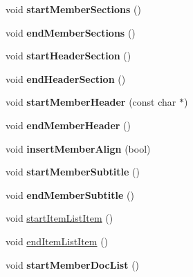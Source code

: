 \begin{DoxyCompactItemize}
\item 
\hypertarget{class_man_generator_aa363f7f143f8451b0fd035e9856f1b87}{void {\bfseries start\-Member\-Sections} ()}\label{class_man_generator_aa363f7f143f8451b0fd035e9856f1b87}

\item 
\hypertarget{class_man_generator_a2f9645e00372366ad64476dbc66cd5ac}{void {\bfseries end\-Member\-Sections} ()}\label{class_man_generator_a2f9645e00372366ad64476dbc66cd5ac}

\item 
\hypertarget{class_man_generator_add9e7a492a43830dd3c77cd0e5c06884}{void {\bfseries start\-Header\-Section} ()}\label{class_man_generator_add9e7a492a43830dd3c77cd0e5c06884}

\item 
\hypertarget{class_man_generator_aeca202ed7306f7d9aa20f8e707d96301}{void {\bfseries end\-Header\-Section} ()}\label{class_man_generator_aeca202ed7306f7d9aa20f8e707d96301}

\item 
\hypertarget{class_man_generator_ae6947537ee279d8d1fe810bc69b3fc7f}{void {\bfseries start\-Member\-Header} (const char $\ast$)}\label{class_man_generator_ae6947537ee279d8d1fe810bc69b3fc7f}

\item 
\hypertarget{class_man_generator_a618c1bfc8806d29116abac6b5817c137}{void {\bfseries end\-Member\-Header} ()}\label{class_man_generator_a618c1bfc8806d29116abac6b5817c137}

\item 
\hypertarget{class_man_generator_a77394a193203024cb6dc72bea70ab195}{void {\bfseries insert\-Member\-Align} (bool)}\label{class_man_generator_a77394a193203024cb6dc72bea70ab195}

\item 
\hypertarget{class_man_generator_a7cf4dbf258928f842c9e96807345bc7a}{void {\bfseries start\-Member\-Subtitle} ()}\label{class_man_generator_a7cf4dbf258928f842c9e96807345bc7a}

\item 
\hypertarget{class_man_generator_a8073c2e7983bc4cd328e4229f51f3bbf}{void {\bfseries end\-Member\-Subtitle} ()}\label{class_man_generator_a8073c2e7983bc4cd328e4229f51f3bbf}

\item 
void \hyperlink{class_man_generator_ab4ab0e8996b14723e45e955fe68f03bc}{start\-Item\-List\-Item} ()
\item 
void \hyperlink{class_man_generator_a61efca8a19608566df04a45d16e88449}{end\-Item\-List\-Item} ()
\item 
\hypertarget{class_man_generator_a45f1ccc157c1f0a3797f633881b4945e}{void {\bfseries start\-Member\-Doc\-List} ()}\label{class_man_generator_a45f1ccc157c1f0a3797f633881b4945e}


\end{DoxyCompactItemize}
